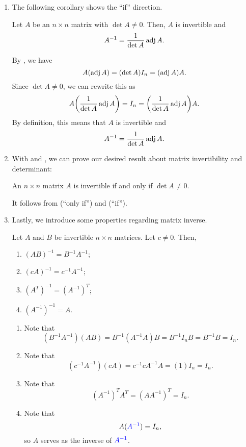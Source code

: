 \begin{enumerate}
\item The following corollary shows the ``if'' direction.
\begin{corollary}
\label{cor:matrix-inv-fmla}
Let \(A\) be an \(n\times n\) matrix with \(\det A\ne 0\). Then, \(A\) is
invertible and
\[
A^{-1}=\frac{1}{\det A}\operatorname{adj} A.
\]
\end{corollary}
\begin{pf}
By , we have
\[
A(\operatorname{adj} A)=(\det A)I_n=(\operatorname{adj} A)A.
\]
Since \(\det A\ne 0\), we can rewrite this as
\[
A\qty(\frac{1}{\det A}\operatorname{adj} A)=I_n=\qty(\frac{1}{\det A}\operatorname{adj} A)A.
\]
By definition, this means that \(A\) is invertible and
\[
A^{-1}=\frac{1}{\det A}\operatorname{adj} A.
\]
\end{pf}
\item With  and , we can prove
our desired result about matrix invertibility and determinant:
\begin{theorem}
\label{thm:inv-iff-nonzero-det}
An \(n\times n\) matrix \(A\) is invertible if and only if \(\det A\ne 0\).
\end{theorem}
\begin{pf}
It follows from  (``only if'') and
 (``if'').
\end{pf}
\item Lastly, we introduce some properties regarding matrix inverse.
\begin{proposition}
\label{prp:matrix-inv-prop}
Let \(A\) and \(B\) be invertible \(n\times n\) matrices. Let \(c\ne 0\). Then,
\begin{enumerate}
\item \((AB)^{-1}=B^{-1}A^{-1}\);
\item \((cA)^{-1}=c^{-1}A^{-1}\);
\item \((A^{T})^{-1}=(A^{-1})^{T}\);
\item \((A^{-1})^{-1}=A\).
\end{enumerate}
\end{proposition}
\begin{pf}
\begin{enumerate}
\item Note that
\[
(B^{-1}A^{-1})(AB)=B^{-1}(A^{-1}A)B=B^{-1}I_nB=B^{-1}B=I_n.
\]
\item Note that
\[
(c^{-1}A^{-1})(cA)=c^{-1}cA^{-1}A=(1)I_n=I_n.
\]
\item Note that
\[
(A^{-1})^{T}A^{T}=(AA^{-1})^{T}=I_n.
\]
\item Note that
\[
A({\color{blue}A^{-1}})=I_n,
\]
so \(A\) serves as the inverse of \({\color{blue}A^{-1}}\).
\end{enumerate}
\end{pf}
\end{enumerate}
